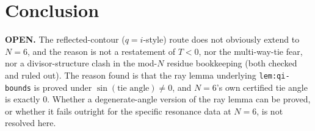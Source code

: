 \documentclass[11pt]{article}
\theoremstyle{plain}
\theoremstyle{remark}
\begin{document}
\section{Conclusion}
\textbf{OPEN.} The reflected-contour ($q=i$-style) route does not obviously extend to $N=6$, and the
reason is not a restatement of $T<0$, nor the multi-way-tie fear, nor a divisor-structure clash in the
mod-$N$ residue bookkeeping (both checked and ruled out). The reason found is that the ray lemma
underlying \texttt{lem:qi-bounds} is proved under $\sin(\text{tie angle})\ne0$, and $N=6$'s own certified
tie angle is exactly $0$. Whether a degenerate-angle version of the ray lemma can be proved, or whether it
fails outright for the specific resonance data at $N=6$, is not resolved here.
\end{document}

